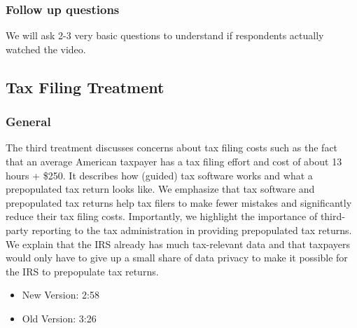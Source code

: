 \documentclass[11pt]{article}
\begin{document}
\subsubsection*{Follow up questions}
We will ask 2-3 very basic questions to understand if respondents actually watched the video.
\subsection{Tax Filing Treatment}
\subsubsection*{General}
The third treatment discusses concerns about tax filing costs such as the fact that an average American taxpayer has a tax filing effort and cost of about 13 hours + \$250. It describes how (guided) tax software works and what a prepopulated tax return looks like. We emphasize that tax software and prepopulated tax returns help tax filers to make fewer mistakes and significantly reduce their tax filing costs. Importantly, we highlight the importance of third-party reporting to the tax administration in providing prepopulated tax returns. We explain that the IRS already has much tax-relevant data and that taxpayers would only have to give up a small share of data privacy to make it possible for the IRS to prepopulate tax returns. 
\\
\begin{itemize}
    \item New Version: 2:58
    \item Old Version: 3:26
\end{itemize}
\end{document}
